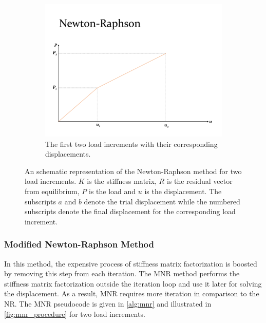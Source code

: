 \documentclass{article}
\begin{document}
\begin{figure}[ht]
        \begin{subfigure}{0.64\textwidth}
            \includegraphics[width=1\linewidth]{figures/nr3.pdf} 
            \caption{The first two load increments with their corresponding displacements.}
            \label{fig:nr3}
        \end{subfigure}
    \caption{An schematic representation of the Newton-Raphson method for two load increments. $K$ is the stiffness matrix, $R$ is the residual vector from equilibrium, $P$ is the load and $u$ is the displacement. The subscripts $a$ and $b$ denote the trial displacement while the numbered subscripts denote the final displacement for the corresponding load increment.}
    \label{fig:nr_procedure}
\end{figure}

\subsubsection{Modified Newton-Raphson Method}
In this method, the expensive process of stiffness matrix factorization is boosted by removing this step from each iteration. The MNR method performs the stiffness matrix factorization outside the iteration loop and use it later for solving the displacement. As a result, MNR requires more iteration in comparison to the NR. The MNR pseudocode is given in \cref{alg:mnr} and illustrated in \cref{fig:mnr_procedure} for two load increments.
\end{document}
